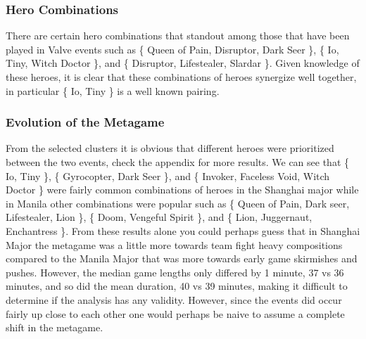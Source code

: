 \documentclass[result.tex]{subfiles}
\begin{document}
\subsubsection*{Hero Combinations}

There are certain hero combinations that standout among those that have been played in Valve events such as \{ Queen of Pain, Disruptor, Dark Seer \}, \{ Io, Tiny, Witch Doctor \}, and  \{ Disruptor, Lifestealer, Slardar \}. Given knowledge of these heroes, it is clear that these combinations of heroes synergize well together, in particular \{ Io, Tiny \} is a well known pairing.

\subsubsection*{Evolution of the Metagame}

From the selected clusters it is obvious that different heroes were prioritized between the two events, check the appendix for more results. We can see that \{ Io, Tiny \}, \{ Gyrocopter, Dark Seer \}, and \{ Invoker, Faceless Void, Witch Doctor \} were fairly common combinations of heroes in the Shanghai major while in Manila other combinations were popular such as \{ Queen of Pain, Dark seer, Lifestealer, Lion \}, \{ Doom, Vengeful Spirit \}, and \{ Lion, Juggernaut, Enchantress \}. From these results alone you could perhaps guess that in Shanghai Major the metagame was a little more towards team fight heavy compositions compared to the Manila Major that was more towards early game skirmishes and pushes. However, the median game lengths only differed by 1 minute, 37 vs 36 minutes, and so did the mean duration, 40 vs 39 minutes, making it difficult to determine if the analysis has any validity. However, since the events did occur fairly up close to each other one would perhaps be naive to assume a complete shift in the metagame.
\end{document}
